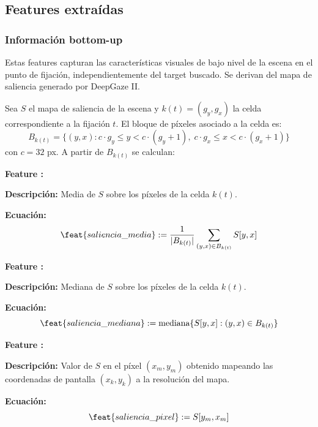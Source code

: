 \subsection{Features extraídas}

\subsubsection{Información bottom-up}

Estas features capturan las características visuales de bajo nivel
de la escena en el punto de fijación, independientemente del target
buscado. Se derivan del mapa de saliencia generado por DeepGaze II.

Sea $S$ el mapa de saliencia de la escena y $k(t) = (g_y, g_x)$
la celda correspondiente a la fijación $t$. El bloque de píxeles
asociado a la celda es:
\begin{equation}
    B_{k(t)} = \{(y, x) : c \cdot g_y \leq y < c \cdot (g_y + 1),\;
    c \cdot g_x \leq x < c \cdot (g_x + 1)\}
\end{equation}
con $c = 32$ px. A partir de $B_{k(t)}$ se calculan:

\begin{featuredef}
\textbf{Feature \thetcbcounter:} 

\textbf{Descripción:} Media de $S$ sobre los píxeles de la celda $k(t)$.

\textbf{Ecuación:}
\begin{equation}
    \feat{saliencia\_media} := \frac{1}{|B_{k(t)}|}
    \sum_{(y,x) \in B_{k(t)}} S[y, x]
\end{equation}
\end{featuredef}

\begin{featuredef}
\textbf{Feature \thetcbcounter:} 

\textbf{Descripción:} Mediana de $S$ sobre los píxeles de la celda $k(t)$.

\textbf{Ecuación:}
\begin{equation}
    \feat{saliencia\_mediana} := \text{mediana}\{S[y, x] : (y, x) \in B_{k(t)}\}
\end{equation}
\end{featuredef}

\begin{featuredef}
\textbf{Feature \thetcbcounter:} 

\textbf{Descripción:} Valor de $S$ en el píxel $(x_m, y_m)$ obtenido
mapeando las coordenadas de pantalla $(x_k, y_k)$ a la resolución del mapa.

\textbf{Ecuación:}
\begin{equation}
    \feat{saliencia\_pixel} := S[y_m, x_m]
\end{equation}
\end{featuredef}

